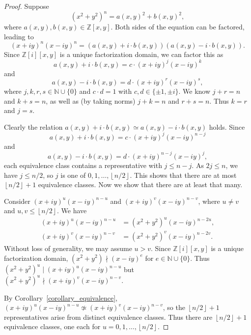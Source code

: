 \documentclass[12pt,table]{article}
\theoremstyle{definition}
\theoremstyle{remark}
\newcommand{\Nnn}{\mathbb N}
\newcommand{\Zzz}{\mathbb Z}
\newcommand{\divides}{\mid}
\newcommand{\notdivides}{\nmid}
\numberwithin{equation}{section}
\newcommand{\myfrac}[2]{#1 / #2}
\begin{document}
\begin{proof}
Suppose 
\[
(x^2 + y^2)^n = a(x,y)^2 + b(x,y)^2,
\]
where $ a(x,y), b(x,y) \in \Zzz[x,y] $.
Both sides of the equation can be factored, leading to  
\[
(x + iy)^n (x -  iy)^n = ( a(x,y) + i \cdot b(x,y) ) ( a(x,y) - i \cdot b(x,y) ) .
\]
Since $ \Zzz [i][x,y] $ is a unique factorization domain,
we can factor this as
\[
a(x,y) + i \cdot b(x,y) = c \cdot (x + iy)^j (x -  iy)^k
\]
and
\[
a(x,y) - i \cdot b(x,y) = d \cdot (x + iy)^r (x -  iy)^s,
\]
where $ j, k, r, s \in \Nnn \cup \{0\} $ and
$c \cdot d = 1 $ with $ c,d \in \{ \pm 1 , \pm i \} $. 
We know $ j + r = n $ and $ k + s = n $, as well as
(by taking norms) $ j + k = n $ and $ r + s = n $.
Thus $k = r$ and $j = s$.

Clearly the relation
$ a(x,y) + i \cdot b(x,y) \simeq  a(x,y) - i \cdot b(x,y) $
holds.
Since 
\[ 
a(x,y) + i \cdot b(x,y) = c \cdot (x + iy)^j (x -  iy)^{n-j} 
\]
and 
\[ 
a(x,y) - i \cdot b(x,y) = d \cdot (x + iy)^{n-j} (x -  iy)^j,
\]
each equivalence class contains a representative with $ j \leq n - j
$.  As $ 2j \leq n $, we have $ j \leq \myfrac{n}{2} $, so $ j $
is one of $ 0, 1, \dotsc, \left\lfloor \myfrac{n}{2} \right\rfloor $. This shows
that there are at most $ \left\lfloor \myfrac{n}{2} \right\rfloor + 1 $
equivalence classes. Now we show that there are at least that many.



Consider $ (x + iy)^u (x -  iy)^{n-u} $  and $ (x + iy)^v (x -  iy)^{n-v} $,
where $ u \neq v $ and $u,v \leq \left \lfloor \myfrac{n}{2} \right \rfloor $. We have
\begin{align*}
(x + iy)^u (x -  iy)^{n-u} &= (x^2 + y^2)^u (x -  iy)^{n-2u},
\\
(x + iy)^v (x -  iy)^{n-v} &= (x^2 + y^2)^v (x -  iy)^{n-2v}.
\end{align*}
Without loss of generality, we may assume $ u > v $. 
Since $ \Zzz [i][x,y] $ is a unique factorization domain,
$ (x^2 + y^2) \notdivides (x -  iy)^e $ for $ e \in \Nnn \cup \{ 0 \} $.
Thus $ (x^2 + y^2)^u \divides (x + iy)^u (x -  iy)^{n-u} $
but $ (x^2 + y^2)^u \notdivides (x + iy)^v (x -  iy)^{n-v} $.

By Corollary~\ref{corollary_equivalence},
$ (x + iy)^u (x -  iy)^{n-u} \not\simeq (x + iy)^v (x -  iy)^{n-v} $, 
so the $ \left\lfloor \myfrac{n}{2} \right\rfloor + 1 $ representatives arise from
distinct equivalence classes.
Thus there are $ \left\lfloor \myfrac{n}{2} \right\rfloor + 1 $ equivalence classes, 
one each for $ u = 0, 1, \dotsc,  \left\lfloor \myfrac{n}{2} \right\rfloor $.
\end{proof}
\end{document}
